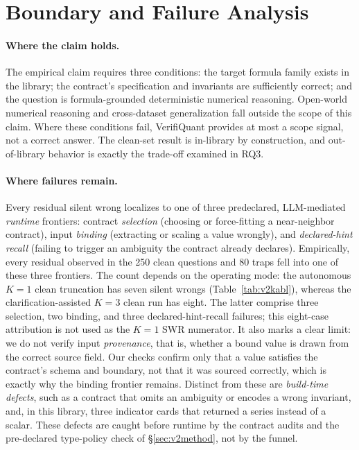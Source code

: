 \documentclass[sigconf,anonymous]{acmart}
\newcommand{\vqAbstainAll}{8}
\newcommand{\vqSelAccAll}{96.7\%}
\newcommand{\vqSWRAll}{3.2\%}
\newcommand{\vqtAbstainAll}{12}
\newcommand{\vqtSWRAll}{1.2\%}
\newcommand{\vqtSelAccAll}{98.7\%}
\begin{document}
\section{Boundary and Failure Analysis}\label{sec:v2boundary}
\paragraph{Where the claim holds.}
The empirical claim requires three conditions: the target formula family exists in the library; the contract's specification and invariants are sufficiently correct; and the question is formula-grounded deterministic numerical reasoning.
Open-world numerical reasoning and cross-dataset generalization fall outside the scope of this claim.
Where these conditions fail, VerifiQuant provides at most a scope signal, not a correct answer.
The clean-set result is in-library by construction, and out-of-library behavior is exactly the trade-off examined in RQ3.

\paragraph{Where failures remain.}
Every residual silent wrong localizes to one of three predeclared, LLM-mediated \emph{runtime} frontiers: contract \emph{selection} (choosing or force-fitting a near-neighbor contract), input \emph{binding} (extracting or scaling a value wrongly), and \emph{declared-hint recall} (failing to trigger an ambiguity the contract already declares).
Empirically, every residual observed in the 250 clean questions and 80 traps fell into one of these three frontiers. The count depends on the operating mode: the autonomous $K{=}1$ clean truncation has seven silent wrongs (Table~\ref{tab:v2kabl}), whereas the clarification-assisted $K{=}3$ clean run has eight. The latter comprise three selection, two binding, and three declared-hint-recall failures; this eight-case attribution is not used as the $K{=}1$ SWR numerator.
It also marks a clear limit: we do not verify input \emph{provenance}, that is, whether a bound value is drawn from the correct source field. Our checks confirm only that a value satisfies the contract's schema and boundary, not that it was sourced correctly, which is exactly why the binding frontier remains.
Distinct from these are \emph{build-time defects}, such as a contract that omits an ambiguity or encodes a wrong invariant, and, in this library, three indicator cards that returned a series instead of a scalar. These defects are caught before runtime by the contract audits and the pre-declared type-policy check of \S\ref{sec:v2method}, not by the funnel.
\end{document}

